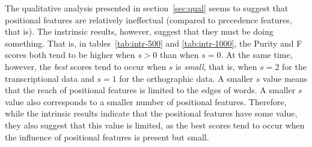 

The qualitative analysis presented in section~\ref{sec:qual} seems to suggest that positional features are relatively ineffectual (compared to precedence features, that is). The instrinsic results, however, suggest that they must be doing something. That is, in tables~\ref{tab:intr-500} and \ref{tab:intr-1000}, the Purity and F scores both tend to be higher when $s > 0$ than when $s = 0$. At the same time, however, the \emph{best} scores tend to occur when $s$ is \emph{small}, that is, when $s = 2$ for the transcriptional data and $s=1$ for the orthographic data. A smaller $s$ value means that the reach of positional features is limited to the edges of words. A smaller $s$ value also corresponds to a smaller number of positional features. Therefore, while the intrinsic results indicate that the positional features have some value, they also suggest that this value is limited, as the best scores tend to occur when the influence of positional features is present but small.

